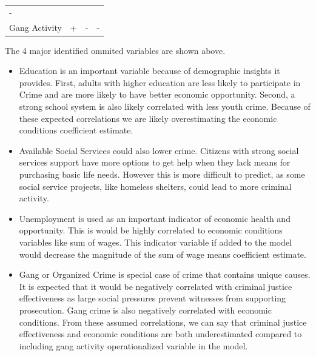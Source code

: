 \documentclass[]{article}
\providecommand{\tightlist}{%
  \setlength{\itemsep}{0pt}\setlength{\parskip}{0pt}}
\begin{document}
\begin{longtable}[]{@{}llll@{}}
\begin{minipage}[t]{0.20\columnwidth}
-\strut
\end{minipage}\tabularnewline
\begin{minipage}[t]{0.18\columnwidth}\raggedright
Gang Activity\strut
\end{minipage} & \begin{minipage}[t]{0.19\columnwidth}\raggedright
+\strut
\end{minipage} & \begin{minipage}[t]{0.31\columnwidth}\raggedright
-\strut
\end{minipage} & \begin{minipage}[t]{0.20\columnwidth}\raggedright
-\strut
\end{minipage}\tabularnewline
\bottomrule
\end{longtable}

The 4 major identified ommited variables are shown above.

\begin{itemize}
\tightlist
\item
  Education is an important variable because of demographic insights it
  provides. First, adults with higher education are less likely to
  participate in Crime and are more likely to have better economic
  opportunity. Second, a strong school system is also likely correlated
  with less youth crime. Because of these expected correlations we are
  likely overestimating the economic conditions coefficient estimate.
\item
  Available Social Services could also lower crime. Citizens with strong
  social services support have more options to get help when they lack
  means for purchasing basic life needs. However this is more difficult
  to predict, as some social service projects, like homeless shelters,
  could lead to more criminal activity.
\item
  Unemployment is used as an important indicator of economic health and
  opportunity. This is would be highly correlated to economic conditions
  variables like sum of wages. This indicator variable if added to the
  model would decrease the magnitude of the sum of wage means
  coefficient estimate.\\
\item
  Gang or Organized Crime is special case of crime that contains unique
  causes. It is expected that it would be negatively correlated with
  criminal justice effectiveness as large social pressures prevent
  witnesses from supporting prosecution. Gang crime is also negatively
  correlated with economic conditions. From these assumed correlations,
  we can say that criminal justice effectiveness and economic conditions
  are both underestimated compared to including gang activity
  operationalized variable in the model.
\end{itemize}
\end{document}
